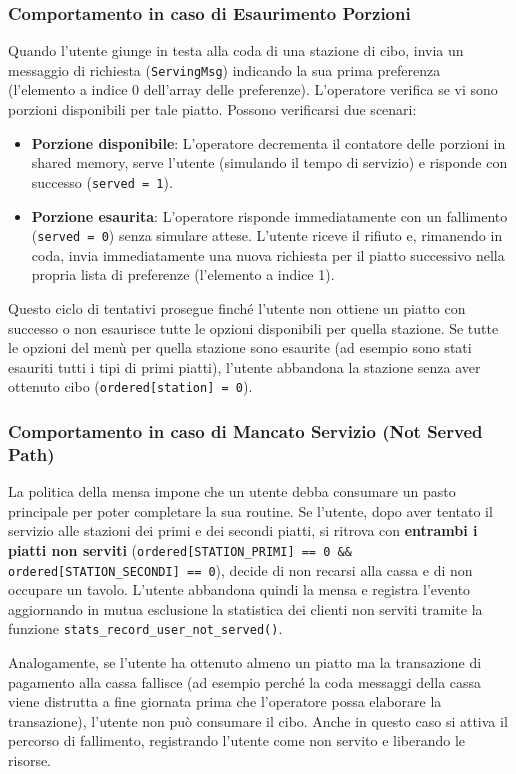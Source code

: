 \documentclass[a4paper,12pt]{article}
\begin{document}
\subsubsection{Comportamento in caso di Esaurimento Porzioni}
Quando l'utente giunge in testa alla coda di una stazione di cibo, invia un messaggio di richiesta (\texttt{ServingMsg}) indicando la sua prima preferenza (l'elemento a indice 0 dell'array delle preferenze).
L'operatore verifica se vi sono porzioni disponibili per tale piatto. Possono verificarsi due scenari:
\begin{itemize}
  \item \textbf{Porzione disponibile}: L'operatore decrementa il contatore delle porzioni in shared memory, serve l'utente (simulando il tempo di servizio) e risponde con successo (\texttt{served = 1}).
  \item \textbf{Porzione esaurita}: L'operatore risponde immediatamente con un fallimento (\texttt{served = 0}) senza simulare attese. L'utente riceve il rifiuto e, rimanendo in coda, invia immediatamente una nuova richiesta per il piatto successivo nella propria lista di preferenze (l'elemento a indice 1).
\end{itemize}
Questo ciclo di tentativi prosegue finché l'utente non ottiene un piatto con successo o non esaurisce tutte le opzioni disponibili per quella stazione. Se tutte le opzioni del menù per quella stazione sono esaurite (ad esempio sono stati esauriti tutti i tipi di primi piatti), l'utente abbandona la stazione senza aver ottenuto cibo (\texttt{ordered[station] = 0}).

\subsubsection{Comportamento in caso di Mancato Servizio (Not Served Path)}
La politica della mensa impone che un utente debba consumare un pasto principale per poter completare la sua routine. Se l'utente, dopo aver tentato il servizio alle stazioni dei primi e dei secondi piatti, si ritrova con \textbf{entrambi i piatti non serviti} (\texttt{ordered[STATION\_PRIMI] == 0 \&\& ordered[STATION\_SECONDI] == 0}), decide di non recarsi alla cassa e di non occupare un tavolo.
L'utente abbandona quindi la mensa e registra l'evento aggiornando in mutua esclusione la statistica dei clienti non serviti tramite la funzione \texttt{stats\_record\_user\_not\_served()}.

Analogamente, se l'utente ha ottenuto almeno un piatto ma la transazione di pagamento alla cassa fallisce (ad esempio perché la coda messaggi della cassa viene distrutta a fine giornata prima che l'operatore possa elaborare la transazione), l'utente non può consumare il cibo. Anche in questo caso si attiva il percorso di fallimento, registrando l'utente come non servito e liberando le risorse.
\end{document}
